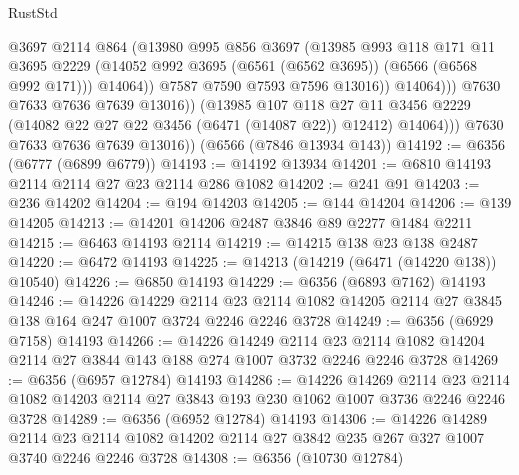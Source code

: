 \begin{lexlean}{RustStd}
\begin{coremodule}
{\begin{coremodule}
{{{{{{{{{{{{{{{{{{{{{{{{{{                          @3697
                          @2114
                          @864
                          (@13980
                            @995
                            @856
                            @3697
                            (@13985
                              @993
                              @118
                              @171
                              @11
                              @3695
                              @2229
                              (@14052 @992 @3695 (@6561 (@6562 @3695)) (@6566 (@6568 @992 @171)))
                              @14064))
                          @7587
                          @7590
                          @7593
                          @7596
                          @13016))
                      @14064)))
                @7630
                @7633
                @7636
                @7639
                @13016))
            (@13985
              @107
              @118
              @27
              @11
              @3456
              @2229
              (@14082 @22 @27 @22 @3456 (@6471 (@14087 @22)) @12412)
              @14064)))
        @7630
        @7633
        @7636
        @7639
        @13016))
    (@6566 (@7846 @13934 @143))
@14192 := @6356 (@6777 (@6899 @6779))
@14193 := @14192 @13934
@14201 := @6810 @14193 @2114 @2114 @27 @23 @2114 @286 @1082
@14202 := @241 @91
@14203 := @236 @14202
@14204 := @194 @14203
@14205 := @144 @14204
@14206 := @139 @14205
@14213 := @14201 @14206 @2487 @3846 @89 @2277 @1484 @2211
@14215 := @6463 @14193 @2114
@14219 := @14215 @138 @23 @138 @2487
@14220 := @6472 @14193
@14225 := @14213 (@14219 (@6471 (@14220 @138)) @10540)
@14226 := @6850 @14193
@14229 := @6356 (@6893 @7162) @14193
@14246 := @14226
    @14229
    @2114
    @23
    @2114
    @1082
    @14205
    @2114
    @27
    @3845
    @138
    @164
    @247
    @1007
    @3724
    @2246
    @2246
    @3728
@14249 := @6356 (@6929 @7158) @14193
@14266 := @14226
    @14249
    @2114
    @23
    @2114
    @1082
    @14204
    @2114
    @27
    @3844
    @143
    @188
    @274
    @1007
    @3732
    @2246
    @2246
    @3728
@14269 := @6356 (@6957 @12784) @14193
@14286 := @14226
    @14269
    @2114
    @23
    @2114
    @1082
    @14203
    @2114
    @27
    @3843
    @193
    @230
    @1062
    @1007
    @3736
    @2246
    @2246
    @3728
@14289 := @6356 (@6952 @12784) @14193
@14306 := @14226
    @14289
    @2114
    @23
    @2114
    @1082
    @14202
    @2114
    @27
    @3842
    @235
    @267
    @327
    @1007
    @3740
    @2246
    @2246
    @3728
@14308 := @6356 (@10730 @12784)
}}}}}}}}}}}}}}}}}}}}}}}}}}
\end{coremodule}}
\end{coremodule}
\end{lexlean}
